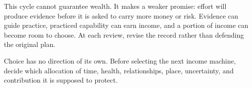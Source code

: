 This cycle cannot guarantee wealth. It makes a weaker promise: effort will
produce evidence before it is asked to carry more money or risk. Evidence can
guide practice, practiced capability can earn income, and a portion of income
can become room to choose. At each review, revise the record rather than
defending the original plan.

Choice has no direction of its own. Before selecting the next income machine,
decide which allocation of time, health, relationships, place, uncertainty, and
contribution it is supposed to protect.

